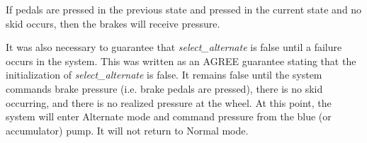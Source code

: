 \begin{tt}
If pedals are pressed in the previous state and pressed in the current state and no skid occurs, then the brakes will receive pressure.
\end{tt}

It was also necessary to guarantee that \textit{select\_alternate} is false until a failure occurs in the system. This was written as an AGREE guarantee stating that the initialization of \textit{select\_alternate} is false. It remains false until the system commands brake pressure (i.e. brake pedals are pressed), there is no skid occurring, and there is no realized pressure at the wheel. At this point, the system will enter Alternate mode and command pressure from the blue (or accumulator) pump. It will not return to Normal mode.

















